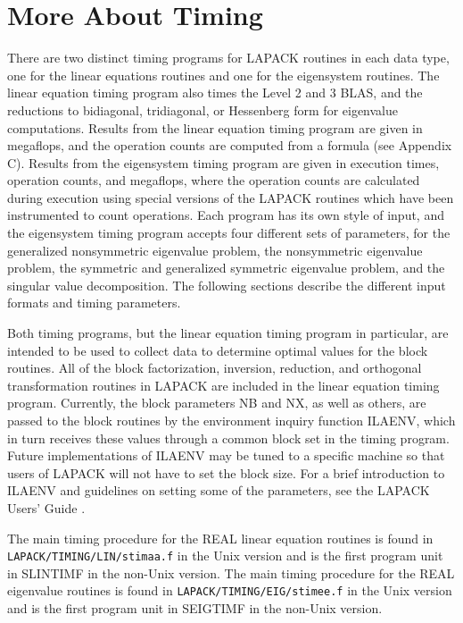 \section{More About Timing}
There are two distinct timing programs for LAPACK routines in
each data type, one for the linear equations routines and one for
the eigensystem routines. 
The linear equation timing program also times the Level 2 and 3 BLAS,
and the reductions
to bidiagonal, tridiagonal, or Hessenberg form for eigenvalue
computations.
Results from the linear equation timing program
are given in megaflops, and the operation counts are computed from
a formula (see Appendix C).
Results from the eigensystem timing program are given in
execution times, operation counts, and megaflops, where the operation
counts are calculated during execution using special versions of the
LAPACK routines which have been instrumented to count operations.
Each program has its own style of input,
and the eigensystem timing program accepts four different sets of
parameters, for
the generalized nonsymmetric eigenvalue problem,
the nonsymmetric eigenvalue problem,
the symmetric and generalized symmetric eigenvalue problem,
and the singular value decomposition.
The following sections describe the different input formats and
timing parameters.

Both timing programs, but
the linear equation timing program in particular,
are intended to be used to collect data to determine optimal values
for the block routines.
All of the block factorization, inversion, reduction, and orthogonal
transformation routines in LAPACK are included in the linear equation
timing program.
Currently, the block parameters NB and NX, as well as others, are
passed to the block routines by the environment inquiry function
ILAENV, which in turn receives these values through a common block
set in the timing program.
Future implementations of ILAENV may be tuned to a specific machine
so that users of LAPACK will not have to set the block size.
For a brief introduction to ILAENV and guidelines on setting some of
the parameters, see the LAPACK Users' Guide \cite{LUG}.

\begin{sloppypar}
The main timing procedure for the REAL linear equation routines
is found in {\tt LAPACK/TIMING/LIN/stimaa.f} in the Unix version and
is the first program unit in SLINTIMF in the non-Unix version.
The main timing procedure for the REAL eigenvalue routines
is found in {\tt LAPACK/TIMING/EIG/stimee.f} in the Unix version and
is the first program unit in SEIGTIMF in the non-Unix version.
\end{sloppypar}
 
